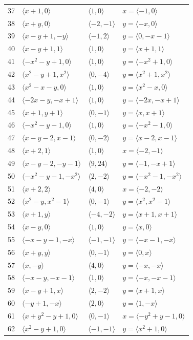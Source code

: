 \documentclass[11pt]{article}
\begin{document}
\begin{longtable}{@{}rlll@{}}
37 & $\langle x+1,0\rangle$ & $\langle 1,0\rangle$ & $x=\langle -1,0\rangle$\\
38 & $\langle x+y,0\rangle$ & $\langle -2,-1\rangle$ & $y=\langle -x,0\rangle$\\
39 & $\langle x-y+1,-y\rangle$ & $\langle -1,2\rangle$ & $y=\langle 0,-x-1\rangle$\\
40 & $\langle x-y+1,1\rangle$ & $\langle 1,0\rangle$ & $y=\langle x+1,1\rangle$\\
41 & $\langle -x^{2}-y+1,0\rangle$ & $\langle 1,0\rangle$ & $y=\langle -x^{2}+1,0\rangle$\\
42 & $\langle x^{2}-y+1,x^{2}\rangle$ & $\langle 0,-4\rangle$ & $y=\langle x^{2}+1,x^{2}\rangle$\\
43 & $\langle x^{2}-x-y,0\rangle$ & $\langle 1,0\rangle$ & $y=\langle x^{2}-x,0\rangle$\\
44 & $\langle -2x-y,-x+1\rangle$ & $\langle 1,0\rangle$ & $y=\langle -2x,-x+1\rangle$\\
45 & $\langle x+1,y+1\rangle$ & $\langle 0,-1\rangle$ & $y=\langle x,x+1\rangle$\\
46 & $\langle -x^{2}-y-1,0\rangle$ & $\langle 1,0\rangle$ & $y=\langle -x^{2}-1,0\rangle$\\
47 & $\langle x-y-2,x-1\rangle$ & $\langle 0,-2\rangle$ & $y=\langle x-2,x-1\rangle$\\
48 & $\langle x+2,1\rangle$ & $\langle 1,0\rangle$ & $x=\langle -2,-1\rangle$\\
49 & $\langle x-y-2,-y-1\rangle$ & $\langle 9,24\rangle$ & $y=\langle -1,-x+1\rangle$\\
50 & $\langle -x^{2}-y-1,-x^{2}\rangle$ & $\langle 2,-2\rangle$ & $y=\langle -x^{2}-1,-x^{2}\rangle$\\
51 & $\langle x+2,2\rangle$ & $\langle 4,0\rangle$ & $x=\langle -2,-2\rangle$\\
52 & $\langle x^{2}-y,x^{2}-1\rangle$ & $\langle 0,-1\rangle$ & $y=\langle x^{2},x^{2}-1\rangle$\\
53 & $\langle x+1,y\rangle$ & $\langle -4,-2\rangle$ & $y=\langle x+1,x+1\rangle$\\
54 & $\langle x-y,0\rangle$ & $\langle 1,0\rangle$ & $y=\langle x,0\rangle$\\
55 & $\langle -x-y-1,-x\rangle$ & $\langle -1,-1\rangle$ & $y=\langle -x-1,-x\rangle$\\
56 & $\langle x+y,y\rangle$ & $\langle 0,-1\rangle$ & $y=\langle 0,x\rangle$\\
57 & $\langle x,-y\rangle$ & $\langle 4,0\rangle$ & $y=\langle -x,-x\rangle$\\
58 & $\langle -x-y,-x-1\rangle$ & $\langle 1,0\rangle$ & $y=\langle -x,-x-1\rangle$\\
59 & $\langle x-y+1,x\rangle$ & $\langle 2,-2\rangle$ & $y=\langle x+1,x\rangle$\\
60 & $\langle -y+1,-x\rangle$ & $\langle 2,0\rangle$ & $y=\langle 1,-x\rangle$\\
61 & $\langle x+y^{2}-y+1,0\rangle$ & $\langle 0,-1\rangle$ & $x=\langle -y^{2}+y-1,0\rangle$\\
62 & $\langle x^{2}-y+1,0\rangle$ & $\langle -1,-1\rangle$ & $y=\langle x^{2}+1,0\rangle$\\
\end{longtable}
\end{document}
